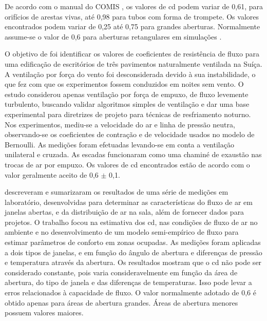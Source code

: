 \documentclass[brazil,hardcopy,openany]{ufscthesis} %
\begin{document}
De acordo com o manual do COMIS \cite{Feustel1990}, os valores de \acrshort{cd} podem variar de 0,61, para orifícios de arestas vivas,	até 0,98 para tubos com forma de trompete. Os valores encontrados podem variar de 0,25 até 0,75 para grandes aberturas. Normalmente assume-se o valor de 0,6 para aberturas retangulares em simulações  \cite{Flourentzou1998, Heiselberg2001, Breesch2010, Iqbal2015, Krzaczek2015, Arendt2017}.

O objetivo de  foi identificar os valores de coeficientes de resistência de fluxo para uma edificação de escritórios de três pavimentos naturalmente ventilada na Suíça. A ventilação por força do vento foi desconsiderada devido à sua instabilidade, o que fez com que os experimentos fossem conduzidos em noites sem vento. O estudo considerou apenas ventilação por força de empuxo, de fluxo levemente turbulento, buscando validar algoritmos simples de ventilação e dar uma base experimental para diretrizes de projeto para técnicas de resfriamento noturno. Nos experimentos, mediu-se a velocidade do ar e linha de pressão neutra, observando-se os coeficientes de contração e de velocidade usados no modelo de Bernoulli. As medições foram efetuadas levando-se em conta a ventilação unilateral e cruzada. As escadas funcionaram como uma chaminé de exaustão nas trocas de ar por empuxo. Os valores de \acrshort{cd} encontrados estão de acordo com o valor geralmente aceito de 0,6 ${\pm}$ 0,1.

 descreveram e sumarizaram os resultados de uma série de medições em laboratório, desenvolvidas para determinar as características do fluxo de ar em janelas abertas, e da distribuição de ar na sala, além de fornecer dados para projetos. O trabalho focou na estimativa dos \acrshort{cd}, nas condições de fluxo de ar no ambiente e no desenvolvimento de um modelo semi-empírico de fluxo para estimar parâmetros de conforto em zonas ocupadas. As medições foram aplicadas a dois tipos de janelas, e em função do ângulo de abertura e diferenças de pressão e temperatura através da abertura. Os resultados mostram que o \acrshort{cd} não pode ser considerado constante, pois varia consideravelmente em função da área de abertura, do tipo de janela e das diferenças de temperaturas. Isso pode levar a erros relacionados à capacidade de fluxo. O valor normalmente adotado de 0,6 é obtido apenas para áreas de abertura grandes. Áreas de abertura menores possuem valores maiores.
\end{document}
